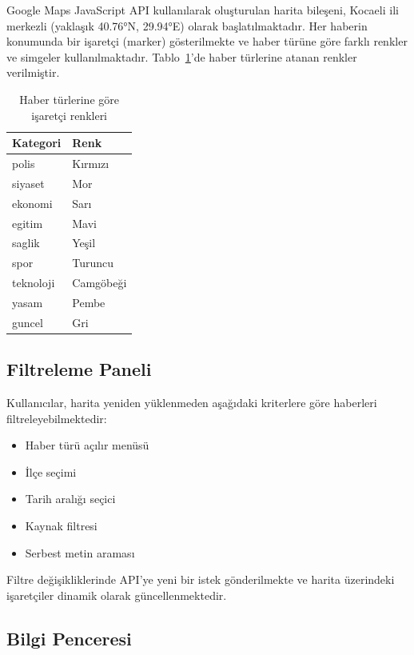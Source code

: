 \documentclass[conference]{IEEEtran}
\begin{document}
Google Maps JavaScript API kullanılarak oluşturulan harita bileşeni, Kocaeli ili merkezli (yaklaşık 40.76°N, 29.94°E) olarak başlatılmaktadır. Her haberin konumunda bir işaretçi (marker) gösterilmekte ve haber türüne göre farklı renkler ve simgeler kullanılmaktadır. Tablo~\ref{tab:renkler}'de haber türlerine atanan renkler verilmiştir.

\begin{table}[H]
\centering
\caption{Haber türlerine göre işaretçi renkleri}
\label{tab:renkler}
\begin{tabular}{@{}ll@{}}
\toprule
\textbf{Kategori} & \textbf{Renk} \\
\midrule
polis & Kırmızı \\
siyaset & Mor \\
ekonomi & Sarı \\
egitim & Mavi \\
saglik & Yeşil \\
spor & Turuncu \\
teknoloji & Camgöbeği \\
yasam & Pembe \\
guncel & Gri \\
\bottomrule
\end{tabular}
\end{table}

\subsection{Filtreleme Paneli}

Kullanıcılar, harita yeniden yüklenmeden aşağıdaki kriterlere göre haberleri filtreleyebilmektedir:
\begin{itemize}[leftmargin=*]
    \item Haber türü açılır menüsü
    \item İlçe seçimi
    \item Tarih aralığı seçici
    \item Kaynak filtresi
    \item Serbest metin araması
\end{itemize}

Filtre değişikliklerinde API'ye yeni bir istek gönderilmekte ve harita üzerindeki işaretçiler dinamik olarak güncellenmektedir.

\subsection{Bilgi Penceresi}
\end{document}
